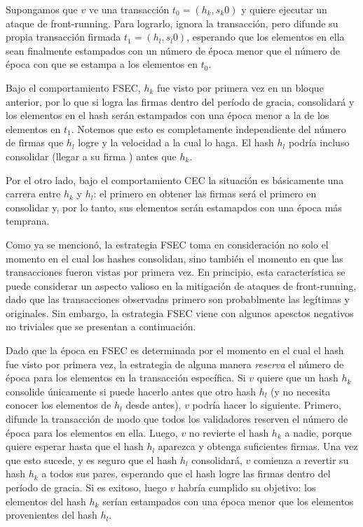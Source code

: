Supongamos que $v$ ve una transacción $t_0 = (h_k, s_{k}0)$ y quiere ejecutar un ataque de front-running.
Para lograrlo, ignora la transacción, pero difunde su propia transacción firmada $t_1 = (h_l, s_{l}0)$,
esperando que los elementos en ella sean finalmente estampados con un número de época menor que el número de época
con que se estampa a los elementos en $t_0$.
%

Bajo el comportamiento FSEC, $h_k$ fue visto por primera vez en un bloque anterior,
por lo que si logra las
\SPH firmas dentro del período de gracia, consolidará y los elementos
en el hash serán estampados con una época menor a la de los elementos en $t_1$.
%
Notemos que esto es completamente independiente del número de firmas que $h_l$ logre y la velocidad
a la cual lo haga. El hash $h_l$ podría incluso consolidar (llegar a su firma \SPH)
antes que $h_k$.
%

Por el otro lado, bajo el comportamiento CEC la situación es básicamente una carrera entre $h_k$ y
$h_l$: el primero en obtener las \SPH firmas será el primero en consolidar y,
por lo tanto, sus elementos serán estamapdos con una época más temprana.
%

Como ya se mencionó, 
la estrategia FSEC toma en consideración no solo el momento en el cual los hashes consolidan, sino
también el momento en que las transacciones fueron vistas por primera vez.
%
En principio, esta característica se puede considerar un aspecto valioso en la mitigación de ataques
de front-running, dado que las transacciones observadas primero son probablmente las legítimas y
originales.
Sin embargo, la estrategia FSEC viene con algunos apesctos negativos no triviales que se presentan
a continuación.


Dado que la época en FSEC es determinada por el momento en el cual el hash fue visto por primera vez, 
la estrategia de alguna manera \textit{reserva} el número de época para los elementos en la transacción específica.
Si $v$ quiere que un hash $h_k$ consolide únicamente si puede hacerlo antes que otro hash
$h_l$ (y no necesita conocer los elementos de $h_l$ desde antes), $v$ podría hacer lo siguiente.
%
Primero, difunde la transacción de modo que todos los validadores reserven el número de época para los elementos en ella.
%
Luego, $v$ no revierte el hash $h_k$ a nadie, porque quiere esperar hasta que el hash $h_l$ aparezca
y obtenga suficientes firmas.
%
Una vez que esto sucede, y es seguro que el hash $h_l$ consolidará, $v$ comienza a revertir su hash
$h_k$ a todos sus pares, esperando que el hash logre las \SPH firmas dentro del período de gracia.
Si es exitoso, luego $v$ habría cumplido su objetivo: los elementos del hash $h_k$ serían estampados
con una época menor que los elementos provenientes del hash $h_l$.
%

